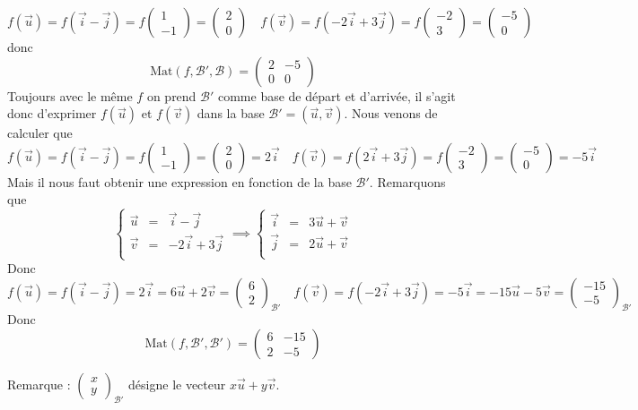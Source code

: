 {{$$f(\vec{u})=f(\vec{i}- \vec{j})=f\begin{pmatrix}1\\-1\end{pmatrix} = \begin{pmatrix}2\\0\end{pmatrix}
\quad 
f(\vec{v})=f(-2\vec{i}+3\vec{j})=f\begin{pmatrix}-2\\3\end{pmatrix} = \begin{pmatrix}-5\\0\end{pmatrix}$$
donc
$$\textrm{Mat}(f,\mathcal{B}',\mathcal{B}) = \begin{pmatrix} 2 & -5 \\ 0 & 0 \end{pmatrix}$$
Toujours avec le même $f$ on prend $\mathcal{B}'$ comme base de départ et d'arrivée,
il s'agit donc d'exprimer $f(\vec{u})$ et $f(\vec{v})$ dans la base $\mathcal{B}'=(\vec{u},\vec{v})$.
Nous venons de calculer que 
$$f(\vec{u})=f(\vec{i}- \vec{j})=f\begin{pmatrix}1\\-1\end{pmatrix} = \begin{pmatrix}2\\0\end{pmatrix}=2\vec{i}
\quad 
f(\vec{v})=f(2\vec{i}+3\vec{j})=f\begin{pmatrix}-2\\3\end{pmatrix} = \begin{pmatrix}-5\\0\end{pmatrix}=-5\vec{i}$$
Mais il  nous faut obtenir une expression en fonction de la base $\mathcal{B}'$.
Remarquons que 
$$\left\{\begin{array}{lcr}
\vec{u} &=& \vec{i}-\vec{j} \\
\vec{v} &=& -2\vec{i}+3\vec{j} \\           
         \end{array}\right.
\implies
\left\{\begin{array}{lcr}
\vec{i} &=& 3\vec{u}+\vec{v} \\
\vec{j} &=& 2\vec{u}+\vec{v} \\           
         \end{array}\right.$$
Donc 
$$f(\vec{u})=f(\vec{i}- \vec{j})=2\vec{i}=6\vec{u}+2\vec{v} = \begin{pmatrix}6\\2\end{pmatrix}_{\mathcal{B}'}
\quad
f(\vec{v})=f(-2\vec{i}+3\vec{j})=-5\vec{i}=-15\vec{u}-5\vec{v} = \begin{pmatrix}-15\\-5\end{pmatrix}_{\mathcal{B}'}$$
Donc
$$\textrm{Mat}(f,\mathcal{B}',\mathcal{B}') = \begin{pmatrix} 6 & -15 \\ 2 & -5 \end{pmatrix}$$

Remarque :
$\begin{pmatrix}x\\y\end{pmatrix}_{\mathcal{B}'}$
désigne le vecteur $x \vec{u}+y\vec{v}$.
}
}
